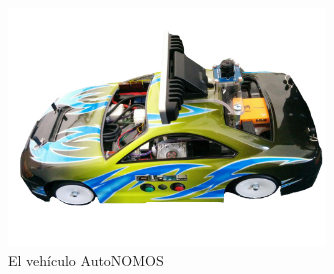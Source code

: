 \documentclass[letterpaper,12pt]{article}
\begin{document}
\begin{figure}
  \centering
  \includegraphics[width=0.75\textwidth]{Figures/coverpic.jpg}
  \caption{El vehículo AutoNOMOS}
  \label{fig:AutoNOMOS}
\end{figure}
\end{document}
